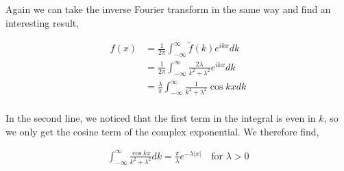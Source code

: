 \documentclass[11pt]{amsart}
\begin{document}
Again we can take the inverse Fourier transform in the same way and find an interesting result,

\begin{align*}
  f(x) &= \frac{1}{2\pi}\int_{-\infty}^{\infty}\tilde{f}(k)e^{ikx}dk \\
       &= \frac{1}{2\pi}\int_{-\infty}^{\infty}\frac{2\lambda}{k^2+\lambda^2}e^{ikx}dk \\
       &= \frac{\lambda}{\pi}\int_{-\infty}^{\infty}\frac{1}{k^2+\lambda^2}\cos{kx}dk \\
\end{align*}

In the second line, we noticed that the first term in the integral is even in $k$, so we only get the cosine term of the complex exponential. We therefore find,

\begin{align*}
  \int_{-\infty}^{\infty} \frac{\cos{kx}}{k^2+\lambda^2} dk = \frac{\pi}{\lambda}e^{-\lambda |x|} \quad \text{for $\lambda > 0$}
\end{align*}
\end{document}
